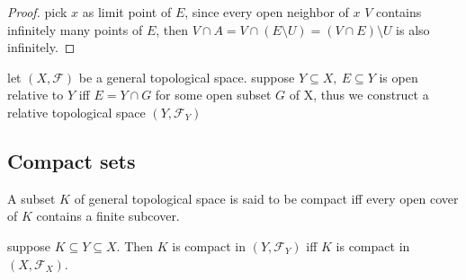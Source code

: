\begin{proof}
    pick $x$ as limit point of $E$, since every open neighbor of $x$ $V$ contains infinitely many points of $E$,
    then $V \cap A = V \cap (E \setminus U) = (V \cap E) \setminus U$  is also infinitely.
\end{proof}

\begin{definition}
    let $(X, \mathscr{F})$ be a general topological space.
    suppose $Y \subseteq X,\: E \subseteq Y$ is open relative to $Y$ iff $E = Y \cap G$ for some open subset $G$
    of X, thus we construct a relative topological space $(Y, \mathscr{F}_Y)$
\end{definition}

\subsection{Compact sets}

\begin{definition}
    A subset $K$ of general topological space is said to be compact iff every open cover of
    $K$ contains a finite subcover.
\end{definition}

\begin{thm}
    suppose $K \subseteq Y \subseteq X$. Then $K$ is compact in $(Y, \mathscr{F}_Y)$ iff $K$ is compact in $(X, \mathscr{F}_X)$.
\end{thm}

